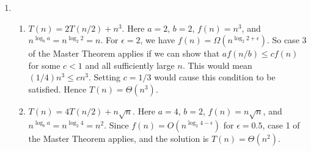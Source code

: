 \documentclass[10pt, letterpaper]{article}
\begin{document}
\begin{enumerate}[label={\bfseries Q\arabic*.}]
  \item
    \begin{enumerate}
      \item
        $T(n) = 2T(n/2) + n^3$. Here $a = 2$, $b = 2$, $f(n) = n^3$, and $n^{\log_b a} = n^{\log_2 2} = n$.
        For $\epsilon = 2$, we have $f(n) = \Omega(n^{\log_2 2 + \epsilon})$. So case $3$ of the Master
        Theorem applies if we can show that $af(n/b) \leq cf(n)$ for some $c < 1$ and all sufficiently large
        $n$. This would mean $(1/4)n^3 \leq cn^3$. Setting $c = 1/3$ would cause this condition to be satisfied.
        Hence $T(n) = \Theta(n^3)$.

      \item
        $T(n) = 4T(n/2) + n\sqrt{n}$. Here $a = 4$, $b = 2$, $f(n) = n\sqrt{n}$, and $n^{\log_b a} = n^{\log_2 4}
        = n^2$. Since $f(n) = O(n^{\log_2 4 - \epsilon})$ for $\epsilon = 0.5$, case 1 of the Master Theorem
        applies, and the solution is $T(n) = \Theta(n^2)$.


\end{enumerate}
\end{enumerate}
\end{document}
